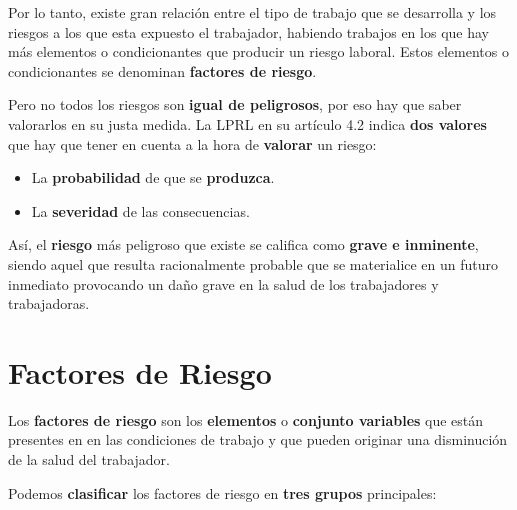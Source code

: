 Por lo tanto, existe gran relación entre el tipo de trabajo que se desarrolla y los riesgos a los que esta expuesto el trabajador, habiendo trabajos en los que hay más elementos o condicionantes que producir un riesgo laboral. Estos elementos o condicionantes  se denominan \textbf{factores de riesgo}.

Pero no todos los riesgos son \textbf{igual de peligrosos}, por eso hay que saber valorarlos en su justa medida. La LPRL en su artículo 4.2 indica \textbf{dos valores} que hay que tener en cuenta a la hora de \textbf{valorar} un riesgo:

\begin{itemize}
    \item La \textbf{probabilidad} de que se \textbf{produzca}.
    \item La \textbf{severidad} de las consecuencias.
\end{itemize}

Así, el \textbf{riesgo} más peligroso que existe se califica como \textbf{grave e inminente}, siendo aquel que resulta racionalmente probable que se materialice en un futuro inmediato provocando un daño grave en la salud de los trabajadores y trabajadoras.

\section{Factores de Riesgo}
Los \textbf{factores de riesgo} son los \textbf{elementos} o \textbf{conjunto variables} que están presentes en en las condiciones de trabajo y que pueden originar una disminución de la salud del trabajador.

Podemos \textbf{clasificar} los factores de riesgo en \textbf{tres grupos} principales:

